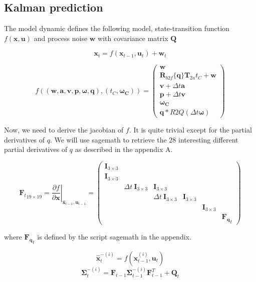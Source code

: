 \documentclass[]{article}
\begin{document}
\subsection{Kalman prediction}\label{kalman-prediction-1}

The model dynamic defines the following model, state-transition function
\(f(\mathbf{x}, \mathbf{u})\) and process noise \(\mathbf{w}\) with
covariance matrix \(\mathbf{Q}\)

\[\mathbf{x}_t = f(\mathbf{x}_{t-1}, \mathbf{u}_t) + \mathbf{w}_t\]

\[f((\mathbf{w}, \mathbf{a}, \mathbf{v}, \mathbf{p}, \boldsymbol{\omega}, \mathbf{q}), (t_C, \mathbf{\boldsymbol{\omega}_C})) = \left( \begin{array}{c}
\mathbf{w}\\
\mathbf{R}_{b2f}\{\mathbf{q}\}\mathbf{T}_{2a} {t_C} + \mathbf{w} \\
\mathbf{v} + \Delta t \mathbf{a} \\
\mathbf{p} + \Delta t \mathbf{v} \\
\mathbf{\boldsymbol{\omega}_C} \\
\mathbf{q}*R2Q({\Delta t} \boldsymbol{\omega})
\end{array} \right)\]

Now, we need to derive the jacobian of \(f\). It is quite trivial except
for the partial derivatives of \(q\). We will use sagemath to retrieve
the 28 interesting different partial derivatives of \(q\) as described
in the appendix A.

\[{\mathbf{F}_t}_{19 \times 19} = \left . \frac{\partial f}{\partial \mathbf{x} } \right \vert _{\hat{\mathbf{x}}_{t-1},\mathbf{u}_{t-1}} = \left( \begin{array}{cccccc}
\mathbf{I}_{3 \times 3} & & & & & \\
\mathbf{I}_{3 \times 3} & & & & & \\
& \Delta t~\mathbf{I}_{3 \times 3} & \mathbf{I}_{3 \times 3} & & & \\
& & \Delta t~\mathbf{I}_{3 \times 3} & \mathbf{I}_{3 \times 3} & & \\
& & & & \mathbf{I}_{3 \times 3} & \\
& & & & & \mathbf{F_q}_t
\end{array} \right)\]

where \(\mathbf{F_q}_t\) is defined by the script sagemath in the
appendix.

\[\hat{\mathbf{x}}^{-(i)}_t = f(\mathbf{x}^{(i)}_{t-1}, \mathbf{u}_t)\]
\[\mathbf{\Sigma}^{-(i)}_t = \mathbf{F}_{t-1} \mathbf{\Sigma}^{-(i)}_{t-1}  \mathbf{F}_{t-1}^T + \mathbf{Q}_t\]
\end{document}
